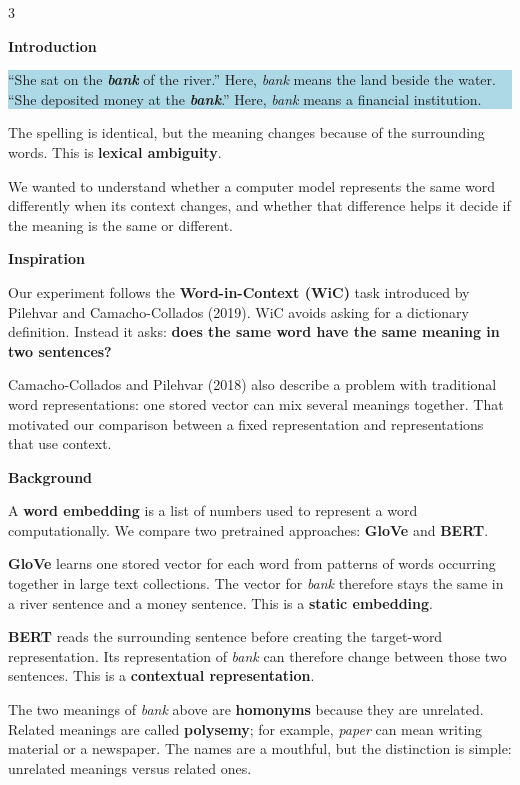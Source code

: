 \documentclass{article}
\newcommand{\sectiontitle}[1]{%
  \Needspace{4\baselineskip}%
  \par\vspace{5mm}%
  {\fontsize{30}{35}\selectfont\bfseries\textcolor{trierblue}{#1}\par}%
  \vspace{6mm}%
}
\newcommand{\keybox}[1]{%
  \colorbox{lightblue}{%
    \parbox{0.955\linewidth}{\vspace{2mm}\RaggedRight #1\vspace{2mm}}%
  }%
}
\begin{document}
\begin{multicols}{3}
\RaggedRight

\sectiontitle{Introduction}
\keybox{%
``She sat on the \textbf{\textit{bank}} of the river.'' Here, \textit{bank} means the land beside the water.\\[1.5mm]
``She deposited money at the \textbf{\textit{bank}}.'' Here, \textit{bank} means a financial institution.
}
\par\vspace{3mm}

The spelling is identical, but the meaning changes because of the surrounding words. This is \textbf{lexical ambiguity}.

We wanted to understand whether a computer model represents the same word differently when its context changes, and whether that difference helps it decide if the meaning is the same or different.

\sectiontitle{Inspiration}
Our experiment follows the \textbf{Word-in-Context (WiC)} task introduced by Pilehvar and Camacho-Collados (2019). WiC avoids asking for a dictionary definition. Instead it asks: \textbf{does the same word have the same meaning in two sentences?}

Camacho-Collados and Pilehvar (2018) also describe a problem with traditional word representations: one stored vector can mix several meanings together. That motivated our comparison between a fixed representation and representations that use context.

\sectiontitle{Background}
A \textbf{word embedding} is a list of numbers used to represent a word computationally. We compare two pretrained approaches: \textbf{GloVe} and \textbf{BERT}.

\textbf{GloVe} learns one stored vector for each word from patterns of words occurring together in large text collections. The vector for \textit{bank} therefore stays the same in a river sentence and a money sentence. This is a \textbf{static embedding}.

\textbf{BERT} reads the surrounding sentence before creating the target-word representation. Its representation of \textit{bank} can therefore change between those two sentences. This is a \textbf{contextual representation}.

The two meanings of \textit{bank} above are \textbf{homonyms} because they are unrelated. Related meanings are called \textbf{polysemy}; for example, \textit{paper} can mean writing material or a newspaper. The names are a mouthful, but the distinction is simple: unrelated meanings versus related ones.


\end{multicols}
\end{document}
